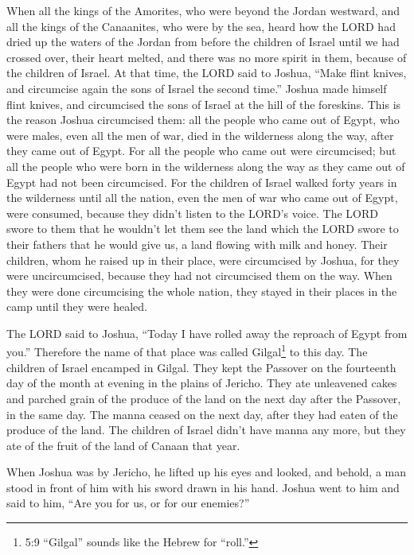  When all the kings of the Amorites, who were beyond the
Jordan westward, and all the kings of the Canaanites, who were by the
sea, heard how the LORD had dried up the waters of the Jordan from
before the children of Israel until we had crossed over, their heart
melted, and there was no more spirit in them, because of the children of
Israel.  At that time, the LORD said to Joshua, ``Make flint
knives, and circumcise again the sons of Israel the second time.''
 Joshua made himself flint knives, and circumcised the sons
of Israel at the hill of the foreskins.  This is the reason
Joshua circumcised them: all the people who came out of Egypt, who were
males, even all the men of war, died in the wilderness along the way,
after they came out of Egypt.  For all the people who came
out were circumcised; but all the people who were born in the wilderness
along the way as they came out of Egypt had not been circumcised.
 For the children of Israel walked forty years in the
wilderness until all the nation, even the men of war who came out of
Egypt, were consumed, because they didn't listen to the LORD's voice.
The LORD swore to them that he wouldn't let them see the land which the
LORD swore to their fathers that he would give us, a land flowing with
milk and honey.  Their children, whom he raised up in their
place, were circumcised by Joshua, for they were uncircumcised, because
they had not circumcised them on the way.  When they were
done circumcising the whole nation, they stayed in their places in the
camp until they were healed.

 The LORD said to Joshua, ``Today I have rolled away the
reproach of Egypt from you.'' Therefore the name of that place was
called Gilgal\footnote{5:9 ``Gilgal'' sounds like the Hebrew for
  ``roll.''} to this day.  The children of Israel encamped
in Gilgal. They kept the Passover on the fourteenth day of the month at
evening in the plains of Jericho.  They ate unleavened
cakes and parched grain of the produce of the land on the next day after
the Passover, in the same day.  The manna ceased on the
next day, after they had eaten of the produce of the land. The children
of Israel didn't have manna any more, but they ate of the fruit of the
land of Canaan that year.

 When Joshua was by Jericho, he lifted up his eyes and
looked, and behold, a man stood in front of him with his sword drawn in
his hand. Joshua went to him and said to him, ``Are you for us, or for
our enemies?''

